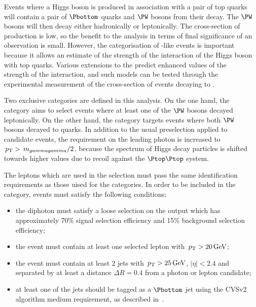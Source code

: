 Events where a Higgs boson is produced in association with a pair of top quarks will contain a pair of $\Pbottom$ quarks and $\PW$ bosons from their decay. The $\PW$ bosons will then decay either hadronically or leptonically. The cross-section of \ttH production is low, so the benefit to the analysis in terms of final significance of an observation is small. However, the categorisation of \ttH-like events is important because it allows an estimate of the strength of the interaction of the Higgs boson with top quarks. Various extensions to the \SM predict enhanced values of the strength of the \ttH interaction, and such models can be tested through the experimental measurement of the cross-section of \ttH events decaying to \Hgg.

Two exclusive \TTHTag categories are defined in this analysis. On the one hand, the \TTHLeptonicTag category aims to select \ttH events where at least one of the $\PW$ bosons decayed leptonically. On the other hand, the \TTHHadronicTag category targets events where both $\PW$ bosons decayed to quarks. In addition to the usual preselection applied to candidate events, the requirement on the leading photon \pT is increased to $\,p_\text{T}>\,m_{gammagamma}/2$, because the \pT spectrum of Higgs decay particles is shifted towards higher values due to recoil against the $\Ptop \Ptop$ system. %

The leptons which are used in the selection must pass the same identification requirements as those uised for the \VHLeptonicTag categories. In order to be included in the \TTHLeptonicTag category, events must satisfy the following conditions:
\begin{itemize}
\item the diphoton must satisfy a loose selection on the \DiPhoBdt output which has approximately 70\% signal selection efficiency and 15\% background selection efficiency; 
\item the event must contain at least one selected lepton with $\,p_\text{T}>20\,\text{Ge\hspace{-.08em}V}$; %
\item the event must contain at least 2 jets with $\,p_\text{T}>25\,\text{Ge\hspace{-.08em}V}$, $|\eta|<2.4$ and separated by at least a distance $\Delta R=0.4$ from a photon or lepton candidate;
\item at least one of the jets should be tagged as a $\Pbottom$ jet using the CVSv2 algorithm medium requirement, as described in~\cite{bjets}.
\end{itemize}

